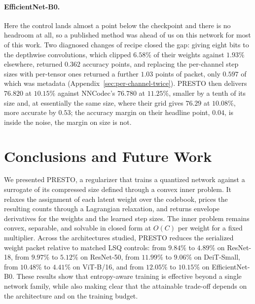 \documentclass{article}
\begin{document}
\paragraph{EfficientNet-B0.} Here the control lands
almost a point below the checkpoint and there is no headroom at all, so a
published method was ahead of us on this network for most of this work. Two
diagnosed changes of recipe closed the gap: giving eight bits to the depthwise
convolutions, which clipped $6.58\%$ of their weights against $1.93\%$ elsewhere,
returned $0.362$ accuracy points, and replacing the per-channel step sizes with
per-tensor ones returned a further $1.03$ points of packet, only $0.597$ of which
was metadata (Appendix~\ref{sec:per-channel-twice}). PRESTO then delivers $76.820$
at $10.15\%$ against NNCodec's $76.780$ at $11.25\%$, smaller by a tenth of its
size and, at essentially the same size, where their grid gives $76.29$ at
$10.08\%$, more accurate by $0.53$; the
accuracy margin on their headline point, $0.04$, is inside the noise, the margin
on size is not.
\section{Conclusions and Future Work}
\label{sec:conclusions}

We presented PRESTO, a regularizer that trains a quantized network against a
surrogate of its compressed size defined through a convex inner problem. It relaxes
the assignment of each latent weight over the codebook, prices the resulting counts
through a Lagrangian relaxation, and returns envelope derivatives for the weights
and the learned step sizes. The inner problem remains convex, separable, and
solvable in closed form at $O(C)$ per weight for a fixed multiplier. Across the
architectures studied, PRESTO reduces the serialized weight packet relative to
matched LSQ controls: from $9.84\%$ to $4.89\%$ on ResNet-18, from $9.97\%$ to
$5.12\%$ on ResNet-50, from $11.99\%$ to $9.06\%$ on DeiT-Small, from
$10.48\%$ to $4.41\%$ on ViT-B/16, and from $12.05\%$ to $10.15\%$ on
EfficientNet-B0. 
These results show that entropy-aware training is effective beyond a single network family,
while also making clear that the attainable trade-off depends on the architecture
and on the training budget. 
\end{document}
